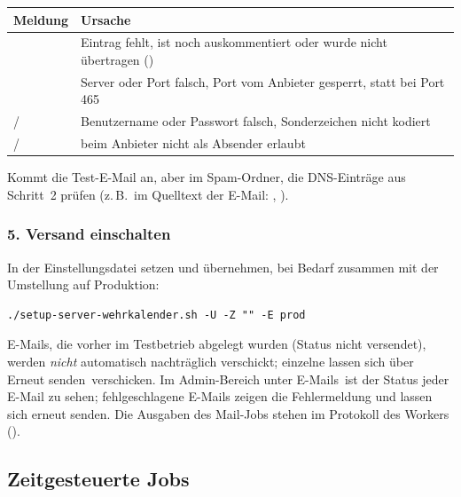 \begin{center}
\begin{tabularx}{\textwidth}{L{5.4cm}X}
\toprule
\textbf{Meldung} & \textbf{Ursache} \\
\midrule
{} & Eintrag fehlt, ist noch auskommentiert
  oder wurde nicht übertragen () \\
 & Server oder Port falsch,
  Port vom Anbieter gesperrt,  statt  bei
  Port 465 \\
 /  & Benutzername oder Passwort
  falsch, Sonderzeichen nicht kodiert \\
 /  &  beim
  Anbieter nicht als Absender erlaubt \\
\bottomrule
\end{tabularx}
\end{center}

Kommt die Test-E-Mail an, aber im Spam-Ordner, die DNS-Einträge aus Schritt~2
prüfen (z.\,B.\ im Quelltext der E-Mail: ,
).

\subsubsection*{5. Versand einschalten}

In der Einstellungsdatei  setzen und übernehmen,
bei Bedarf zusammen mit der Umstellung auf Produktion:

\begin{lstlisting}
./setup-server-wehrkalender.sh -U -Z "" -E prod
\end{lstlisting}

E-Mails, die vorher im Testbetrieb abgelegt wurden (Status
\glqq nicht versendet\grqq), werden \emph{nicht} automatisch nachträglich
verschickt; einzelne lassen sich über \glqq Erneut senden\grqq\ verschicken.
Im Admin-Bereich unter \glqq E-Mails\grqq\ ist der Status jeder E-Mail zu
sehen; fehlgeschlagene E-Mails zeigen die Fehlermeldung und lassen sich
erneut senden. Die Ausgaben des Mail-Jobs stehen im Protokoll des Workers
().

\subsection{Zeitgesteuerte Jobs}

